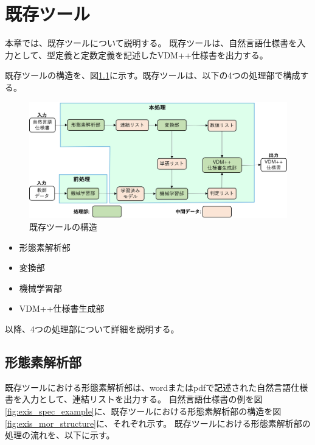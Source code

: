 \chapter{既存ツール}\label{cha:Function}

本章では、既存ツール\cite{shigyo1,shigyo2, shigyo3,shigyo4}について説明する。
既存ツールは、自然言語仕様書を入力として、型定義と定数定義を記述したVDM++仕様書を出力する。

既存ツールの構造を、図\ref{fig:exis_structure}に示す。既存ツールは、以下の4つの処理部で構成する。

\begin{figure}[tp]
    \begin{center}
        \includegraphics[width=1.0\columnwidth]{image/exis_structure.png}
        \caption{既存ツールの構造}
        \label{fig:exis_structure}
    \end{center}
\end{figure}

\begin{itemize}
    \item 形態素解析部
    \item 変換部
    \item 機械学習部
    \item VDM++仕様書生成部
\end{itemize}

以降、4つの処理部について詳細を説明する。

\section{形態素解析部}
既存ツールにおける形態素解析部は、wordまたはpdfで記述された自然言語仕様書を入力として、連結リストを出力する。
自然言語仕様書の例を図\ref{fig:exis_spec_example}に、既存ツールにおける形態素解析部の構造を図\ref{fig:exis_mor_structure}に、それぞれ示す。
既存ツールにおける形態素解析部の処理の流れを、以下に示す。

